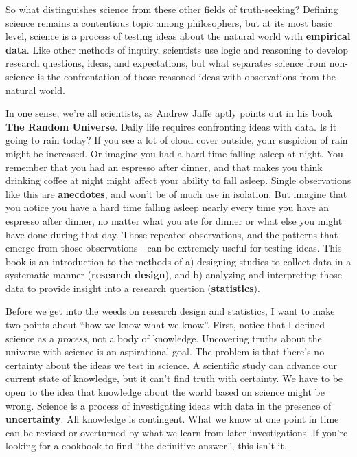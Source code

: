 \documentclass[
]{book}
\begin{document}
So what distinguishes science from these other fields of truth-seeking? Defining science remains a contentious topic among philosophers, but at its most basic level, science is a process of testing ideas about the natural world with \textbf{empirical data}. Like other methods of inquiry, scientists use logic and reasoning to develop research questions, ideas, and expectations, but what separates science from non-science is the confrontation of those reasoned ideas with observations from the natural world.

In one sense, we're all scientists, as Andrew Jaffe aptly points out in his book \textbf{The Random Universe}. Daily life requires confronting ideas with data. Is it going to rain today? If you see a lot of cloud cover outside, your suspicion of rain might be increased. Or imagine you had a hard time falling asleep at night. You remember that you had an espresso after dinner, and that makes you think drinking coffee at night might affect your ability to fall asleep. Single observations like this are \textbf{anecdotes}, and won't be of much use in isolation. But imagine that you notice you have a hard time falling asleep nearly every time you have an espresso after dinner, no matter what you ate for dinner or what else you might have done during that day. Those repeated observations, and the patterns that emerge from those observations - can be extremely useful for testing ideas. This book is an introduction to the methods of a) designing studies to collect data in a systematic manner (\textbf{research design}), and b) analyzing and interpreting those data to provide insight into a research question (\textbf{statistics}).

Before we get into the weeds on research design and statistics, I want to make two points about ``how we know what we know''. First, notice that I defined science as a \emph{process}, not a body of knowledge. Uncovering truths about the universe with science is an aspirational goal. The problem is that there's no certainty about the ideas we test in science. A scientific study can advance our current state of knowledge, but it can't find truth with certainty. We have to be open to the idea that knowledge about the world based on science might be wrong. Science is a process of investigating ideas with data in the presence of \textbf{uncertainty}. All knowledge is contingent. What we know at one point in time can be revised or overturned by what we learn from later investigations. If you're looking for a cookbook to find ``the definitive answer'', this isn't it.
\end{document}
